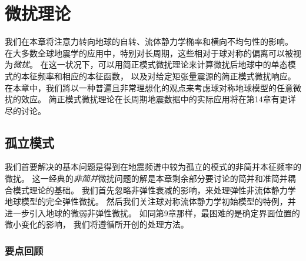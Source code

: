 \chapter{微扰理论}

我们在本章将注意力转向地球的自转、流体静力学椭率和横向不均匀性的影响。
在大多数全球地震学的应用中，特别对长周期，这些相对于球对称的偏离可以被视为{\em 微扰\/}。
%
在这一状况下，可以用简正模式微扰理论来计算微扰后地球中的单态模式的本征频率和相应的本征函数，
以及对给定矩张量震源的简正模式微扰响应。
在本章中，我们將以一种普遍且非常理想化的观点来考虑球对称地球模型的任意微扰的效应。
简正模式微扰理论在长周期地震数据中的实际应用将在第14章有更详尽的讨论。

\section{孤立模式}
%
%

我们首要解决的基本问题是得到在地震频谱中较为孤立的模式的非简并本征频率的微扰。
这一经典的{\em 非简并\/}微扰问题的解是本章剩余部分要讨论的简并和准简并耦合模式理论的基础。
%
%
我们首先忽略非弹性衰减的影响，来处理弹性非流体静力学地球模型的完全弹性微扰。
然后我们关注球对称流体静力学初始模型的特例，并进一步引入地球的微弱非弹性微扰。
如同第9章那样，最困难的是确定界面位置的微小变化的影响，
我们将遵循\textcite{woodhouse&dahlen78}所开创的处理方法。

\subsection{要点回顾}

